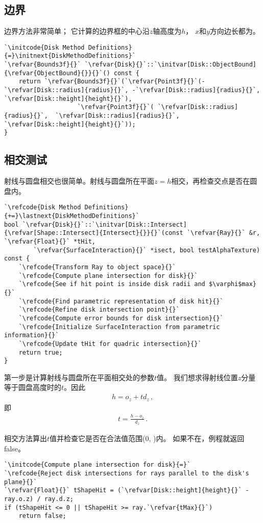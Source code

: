 \subsection{边界}\label{sub:边界4}
边界方法非常简单；
它计算的边界框的中心沿$z$轴高度为$h$，
$x$和$y$方向边长都为。
\begin{lstlisting}
`\initcode{Disk Method Definitions}{=}\initnext{DiskMethodDefinitions}`
`\refvar{Bounds3f}{}` `\refvar{Disk}{}`::`\initvar[Disk::ObjectBound]{\refvar{ObjectBound}{}}{}`() const {
    return `\refvar{Bounds3f}{}`(`\refvar{Point3f}{}`(-`\refvar[Disk::radius]{radius}{}`, -`\refvar[Disk::radius]{radius}{}`, `\refvar[Disk::height]{height}{}`),
                    `\refvar{Point3f}{}`( `\refvar[Disk::radius]{radius}{}`,  `\refvar[Disk::radius]{radius}{}`, `\refvar[Disk::height]{height}{}`));
}
\end{lstlisting}

\subsection{相交测试}\label{sub:相交测试4}
射线与圆盘相交也很简单。射线与圆盘所在平面$z=h$相交，再检查交点是否在圆盘内。
\begin{lstlisting}
`\refcode{Disk Method Definitions}{+=}\lastnext{DiskMethodDefinitions}`
bool `\refvar{Disk}{}`::`\initvar[Disk::Intersect]{\refvar[Shape::Intersect]{Intersect}{}}{}`(const `\refvar{Ray}{}` &r, `\refvar{Float}{}` *tHit,
        `\refvar{SurfaceInteraction}{}` *isect, bool testAlphaTexture) const {
    `\refcode{Transform Ray to object space}{}`
    `\refcode{Compute plane intersection for disk}{}`
    `\refcode{See if hit point is inside disk radii and $\varphi$max}{}`
    `\refcode{Find parametric representation of disk hit}{}`
    `\refcode{Refine disk intersection point}{}`
    `\refcode{Compute error bounds for disk intersection}{}`
    `\refcode{Initialize SurfaceInteraction from parametric information}{}`
    `\refcode{Update tHit for quadric intersection}{}`
    return true;
}
\end{lstlisting}

第一步是计算射线与圆盘所在平面相交处的参数$t$值。
我们想求得射线位置$z$分量等于圆盘高度时的$t$。因此
\begin{align*}
    h=o_z+td_z\, ,
\end{align*}
即
\begin{align*}
    t=\frac{h-o_z}{d_z}\, .
\end{align*}

相交方法算出$t$值并检查它是否在合法值范围{\ttfamily (0, )}内。
如果不在，例程就返回{\ttfamily false}。
\begin{lstlisting}
`\initcode{Compute plane intersection for disk}{=}`
`\refcode{Reject disk intersections for rays parallel to the disk's plane}{}`
`\refvar{Float}{}` tShapeHit = (`\refvar[Disk::height]{height}{}` - ray.o.z) / ray.d.z;
if (tShapeHit <= 0 || tShapeHit >= ray.`\refvar{tMax}{}`)
    return false;
\end{lstlisting}


